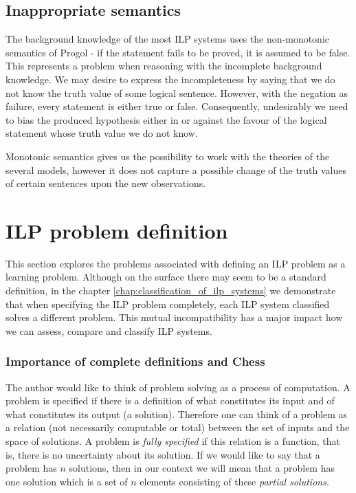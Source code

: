 \subsection{Inappropriate semantics}
The background knowledge of the most ILP systems uses the non-monotonic semantics of Progol - if the statement fails to be proved, it is assumed to be false. This represents a problem when reasoning with the incomplete background knowledge. We may desire to express the incompleteness by saying that we do not know the truth value of some logical sentence. However, with the negation as failure, every statement is either true or false. Consequently, undesirably we need to bias the produced hypothesis either in or against the favour of the logical statement whose truth value we do not know.

Monotonic semantics gives us the possibility to work with the theories of the several models, however it does not capture a possible change of the truth values of certain sentences upon the new observations.

\section{ILP problem definition}\label{ilp_problem_definition}
This section explores the problems associated with defining an ILP problem as a learning problem. Although on the surface there may seem to be a standard definition, in the chapter \ref{chap:classification_of_ilp_systems} we demonstrate that when specifying the ILP problem completely, each ILP system classified solves a different problem. This mutual incompatibility has a major impact how we can assess, compare and classify ILP systems.

\subsubsection{Importance of complete definitions and Chess}
The author would like to think of problem solving as a process of computation. A problem is specified if there is a definition of what constitutes its input and of what constitutes its output (a solution). Therefore one can think of a problem as a relation (not necessarily computable or total) between the set of inputs and the space of solutions. A problem is \emph{fully specified} if this relation is a function, that is, there is no uncertainty about its solution. If we would like to say that a problem has $n$ solutions, then in our context we will mean that a problem has one solution which is a set of $n$ elements consisting of these \emph{partial solutions}.

